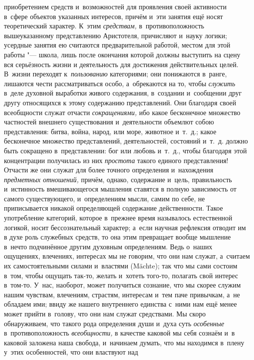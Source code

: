 приобретением средств и~возможностей для проявления своей активности в~сфере
объектов указанных интересов, причём и~эти занятия ещё носят теоретический
характер. К~этим {\em средствам,} в~противоположность вышеуказанному
представлению Аристотеля, причисляют и~науку логики; усердные занятия ею
считаются предварительной работой, местом для этой работы "--- школа, лишь
после окончания которой должны выступить на сцену вся серьёзность жизни и
деятельность для достижения действительных целей. В~жизни переходят
к~{\em пользованию} категориями; они понижаются в~ранге, лишаются чести
рассматриваться особо, а~обрекаются на то, чтобы {\em служить} в~деле духовной
выработки живого содержания, в~создании и~сообщении друг другу относящихся к
этому содержанию представлений. Они благодаря своей всеобщности служат отчасти
{\em сокращениями,} ибо какое бесконечное множество частностей внешнего
существования и~деятельности объемлют собою представления: битва, война, народ,
или море, животное и~т.~д.; какое бесконечное множество представлений,
деятельностей, состояний и~т.~д. должно быть сокращено в~представлении: бог или
любовь и~т.~д., чтобы благодаря этой концентрации получилась из них
{\em простота} такого единого представления! Отчасти же они служат для более
точного определения и~нахождения {\em предметных отношений,} причём, однако,
содержание и~цель, правильность и~истинность вмешивающегося мышления ставятся в
полную зависимость от самого существующего, и~определениям мысли, самим по
себе, не приписывается никакой определяющей содержание действенности. Такое
употребление категорий, которое в~прежнее время называлось естественной
логикой, носит бессознательный характер; а~если научная рефлексия отводит им в
духе роль служебных средств, то она этим превращает вообще мышление в~нечто
подчинённое другим духовным определениям. Ведь о~наших ощущениях, влечениях,
интересах мы не говорим, что они нам служат, а~считаем их самостоятельными
силами и~властями (Mächte); так что мы сами состоим в~том, чтобы ощущать
так-то, желать и~хотеть того-то, полагать свой интерес в~том-то. У~нас,
наоборот, может получиться сознание, что мы скорее служим нашим чувствам,
влечениям, страстям, интересам и~тем паче привычкам, а~не обладаем ими; ввиду
же нашего внутреннего единства с~ними нам ещё менее может прийти в~голову, что
они нам служат средствами. Мы скоро обнаруживаем, что такого рода определения
души и~духа суть {\em особенные} в~противоположность {\em всеобщности,} в
качестве каковой мы себя сознаём и~в каковой заложена наша свобода, и~начинаем
думать, что мы находимся в~плену у~этих особенностей, что они властвуют над

